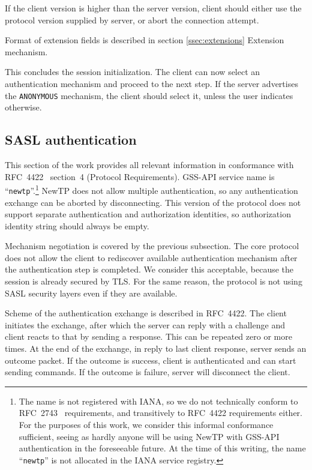 If the client version is higher than the server version, client should either use the protocol version
supplied by server, or abort the connection attempt.

Format of extension fields is described in section \ref{ssec:extensions} Extension mechanism.

This concludes the session initialization. The client can now select an authentication mechanism and proceed
to the next step. If the server advertises the {\tt ANONYMOUS} mechanism, the client should select it, unless
the user indicates otherwise.

%

\subsection{SASL authentication}

This section of the work provides all relevant information in conformance with RFC~4422~\cite{rfc4422}
section~4 (Protocol Requirements). GSS-API service name is ``{\tt newtp}''.\footnote{The name is not
registered with IANA, so we do not technically conform to RFC~2743~\cite{rfc2743} requirements, and
transitively to RFC~4422 requirements either. For the purposes of this work, we consider this informal
conformance sufficient, seeing as hardly anyone will be using NewTP with GSS-API authentication in the
foreseeable future. At the time of this writing, the name ``{\tt newtp}'' is not allocated in the IANA service
registry.} NewTP does not allow multiple authentication, so any authentication exchange can be aborted by
disconnecting. This version of the protocol does not support separate authentication and authorization
identities, so authorization identity string should always be empty.

Mechanism negotiation is covered by the previous subsection. The core protocol does not allow the client to
rediscover available authentication mechanism after the authentication step is completed. We consider this
acceptable, because the session is already secured by TLS. For the same reason, the protocol is not using SASL
security layers even if they are available.

Scheme of the authentication exchange is described in RFC~4422. The client initiates the exchange, after which
the server can reply with a challenge and client reacts to that by sending a response. This can be repeated
zero or more times. At the end of the exchange, in reply to last client response, server sends an outcome
packet.  If the outcome is success, client is authenticated and can start sending commands. If the outcome is
failure, server will disconnect the client.

